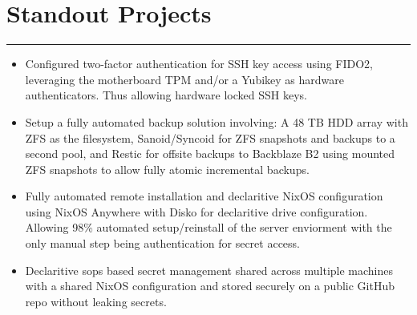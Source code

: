 \documentclass[a4paper,11pt]{article}
\begin{document}
\vspace{-1.1cm}
\section*{\hspace*{1em} Standout Projects}
\vspace{-0.2cm}
\hrule
\vspace{0.3cm}
\begin{itemize}
    \item Configured two-factor authentication for SSH key access using FIDO2, leveraging the motherboard TPM and/or a Yubikey as hardware authenticators. Thus allowing hardware locked SSH keys. \\
    \vspace{-0.5cm}
    \item Setup a fully automated backup solution involving: A 48 TB HDD array with ZFS as the filesystem, Sanoid/Syncoid for ZFS snapshots and backups to a second pool, and Restic for offsite backups to Backblaze B2 using mounted ZFS snapshots to allow fully atomic incremental backups. \\
    \vspace{-0.5cm}
    \item Fully automated remote installation and declaritive NixOS configuration using NixOS Anywhere with Disko for declaritive drive configuration. Allowing 98\% automated setup/reinstall of the server enviorment with the only manual step being authentication for secret access. \\
    \vspace{-0.5cm}
    \item Declaritive sops based secret management shared across multiple machines with a shared NixOS configuration and stored securely on a public GitHub repo without leaking secrets. \\
    \vspace{-0.5cm}
\end{itemize}
\end{document}
